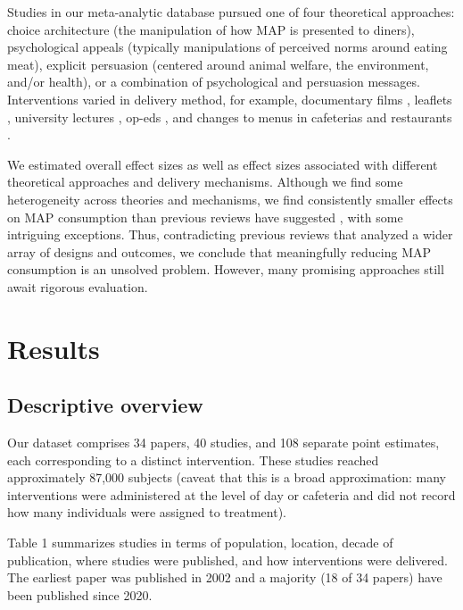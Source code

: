 \documentclass[sn-nature,referee,pdflatex]{sn-jnl}
\begin{document}
Studies in our meta-analytic database pursued one of four theoretical
approaches: choice architecture (the manipulation of how MAP is
presented to diners), psychological appeals (typically manipulations of
perceived norms around eating meat), explicit persuasion (centered
around animal welfare, the environment, and/or health), or a combination
of psychological and persuasion messages. Interventions varied in
delivery method, for example, documentary films
\citep{mathur2021effectiveness}, leaflets \citep{peacock2017},
university lectures \citep{jalil2023}, op-eds \citep{haile2021}, and
changes to menus in cafeterias \citep{andersson2021} and restaurants
\citep{coker2022, sparkman2021}.

We estimated overall effect sizes as well as effect sizes associated
with different theoretical approaches and delivery mechanisms. Although
we find some heterogeneity across theories and mechanisms, we find
consistently smaller effects on MAP consumption than previous reviews
have suggested
\citep{bianchi2018restructuring, byerly2018, chang2023, harguess2020, kwasny2022, mathur2021meta, meier2022, pandey2023},
with some intriguing exceptions. Thus, contradicting previous reviews
that analyzed a wider array of designs and outcomes, we conclude that
meaningfully reducing MAP consumption is an unsolved problem. However,
many promising approaches still await rigorous evaluation.

\section{Results}\label{sec2}

\subsection{Descriptive overview}\label{descriptive-overview}

Our dataset comprises 34 papers, 40 studies, and 108 separate point
estimates, each corresponding to a distinct intervention. These studies
reached approximately 87,000 subjects (caveat that this is a broad
approximation: many interventions were administered at the level of day
or cafeteria and did not record how many individuals were assigned to
treatment).

Table 1 summarizes studies in terms of population, location, decade of
publication, where studies were published, and how interventions were
delivered. The earliest paper was published in 2002 \citep{allen2002}
and a majority (18 of 34 papers) have been published since 2020.
\end{document}
